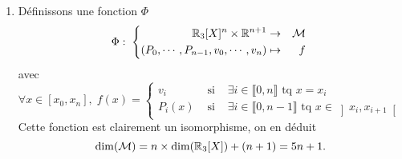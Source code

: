 \begin{enumerate}
\begin{enumerate}
  \item Soit $0\leq p \leq d$. Tout vecteur de $E$ se décompose dans la base $(a_, \cdots, a_d)$
\begin{displaymath}
\forall x\in E, \; x = \sum_{i=1}^d \alpha_i(x) a_i  
\end{displaymath}
On en déduit 
\begin{displaymath}
  x \in \ker \alpha_1 \cap \cdots \cap \ker \alpha_p \Rightarrow x \in \Vect \left( a_{p+1},\cdots,a_d\right) 
\end{displaymath}
Réciproquement, les relations $\alpha_i(a_j) = \delta_{i,j}$ montrent que 
\begin{displaymath}
  a_{p+1}, \cdots, a_d \in \ker \alpha_1 \cap \cdots \cap \ker \alpha_p
\end{displaymath}
On en déduit que $\left( a_{p+1}, \cdots , a_d\right)$ est une base de $\ker \alpha_1 \cap \cdots \cap \ker \alpha_p$.
  
  \item Si $(\beta_1,\cdots,\beta_p)$ une famille libre de formes linéaires, on peut la compléter (théorème de la base incomplète) en une base de $E^*$ et utiliser la question précédente  d'où
\begin{displaymath}
  \dim\left( \ker \beta_1 \cap \cdots \cap \ker \beta_p\right) = \dim(E) - p.
\end{displaymath}
\end{enumerate}

  \item Définissons une fonction $\Phi$
\begin{displaymath}
  \Phi:\;
\left\lbrace 
\begin{aligned}
  \mathbb{R}_3[X]^n\times \mathbb{R}^{n+1} &\rightarrow& \mathcal{M}\\
  (P_0,\cdots,P_{n-1},v_0,\cdots, v_n) &\mapsto& f
\end{aligned}
\right. \;
\end{displaymath}
avec 
\begin{displaymath}
\forall x \in [x_0,x_n],\;
f(x)=
\left\lbrace 
\begin{aligned}
  v_i &\text{ si }& \exists i \in \llbracket 0,n \rrbracket \text{ tq } x=x_i \\
  P_i(x) &\text{ si }& \exists i \in \llbracket 0,n-1 \rrbracket \text{ tq } x \in \left] x_i , x_{i+1}\right[ 
\end{aligned}
\right.   
\end{displaymath}
Cette fonction est clairement un isomorphisme, on en déduit
\begin{displaymath}
  \dim(\mathcal{M}) = n\times \dim(\mathbb{R}_3[X]) + (n+1) = 5n + 1.
\end{displaymath}


\end{enumerate}

